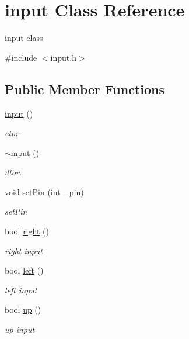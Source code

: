 \hypertarget{classinput}{\section{input Class Reference}
\label{classinput}
}


input class  




{\ttfamily \#include $<$input.\-h$>$}

\subsection*{Public Member Functions}
\begin{DoxyCompactItemize}
\item 
\hyperlink{classinput_adac0ea346c43d7762baef3e3f387eebd}{input} ()
\begin{DoxyCompactList}\small\item\em ctor \end{DoxyCompactList}\item 
\hyperlink{classinput_a42c3af557d6d247deb8648550c490840}{$\sim$input} ()
\begin{DoxyCompactList}\small\item\em dtor. \end{DoxyCompactList}\item 
void \hyperlink{classinput_abd96ffd703255fa6d6accced9c659083}{set\-Pin} (int \-\_\-pin)
\begin{DoxyCompactList}\small\item\em set\-Pin \end{DoxyCompactList}\item 
bool \hyperlink{classinput_a5a3033dd853b1b7647e87b1a2ce0935f}{right} ()
\begin{DoxyCompactList}\small\item\em right input \end{DoxyCompactList}\item 
bool \hyperlink{classinput_a51c9f2745deb20753cdf948e9e7f6419}{left} ()
\begin{DoxyCompactList}\small\item\em left input \end{DoxyCompactList}\item 
bool \hyperlink{classinput_a62b8ecc2d123601baba9f780736cb9f9}{up} ()
\begin{DoxyCompactList}\small\item\em up input \end{DoxyCompactList}\item 

\end{DoxyCompactItemize}
